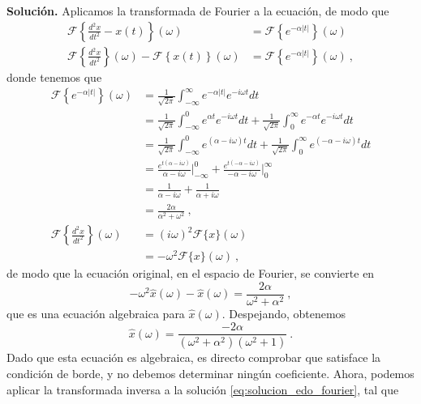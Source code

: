 \begin{ejemplo}
    \textbf{Solución.} Aplicamos la transformada de Fourier a la ecuación, de modo que
    \begin{align}
        \mathcal{F}\left\{ \frac{d^2 x}{dt^2} - x(t) \right\}(\omega) & =  \mathcal{F} \left\{ e^{-\alpha |t|} \right\}(\omega) \\
        \mathcal{F} \left\{ \frac{d^2x}{dt^2} \right\}(\omega) - \mathcal{F} \left\{ x(t) \right\}(\omega)  & = \mathcal{F} \left\{ e^{-\alpha |t|} \right\}(\omega) \ ,
    \end{align}
    donde tenemos que
    \begin{align}
        \mathcal{F} \left\{ e^{-\alpha |t|} \right\}(\omega) & = \frac{1}{\sqrt{2\pi}} \int_{-\infty}^\infty e^{-\alpha |t|} e^{-i\omega t} dt \nonumber \\
        & = \frac{1}{\sqrt{2\pi}} \int_{-\infty}^0 e^{\alpha t} e^{-i\omega t} dt + \frac{1}{\sqrt{2\pi}} \int_0^\infty e^{-\alpha t} e^{-i\omega t} dt \nonumber \\
        & = \frac{1}{\sqrt{2\pi}} \int_{-\infty}^0 e^{(\alpha -i\omega) t} dt + \frac{1}{\sqrt{2\pi}} \int_0^\infty e^{(-\alpha -i\omega) t} dt \nonumber \\
        & = \frac{e^{t(\alpha - i \omega)}}{\alpha - i\omega} \left.\right|_{-\infty}^0 + \frac{e^{t(-\alpha - i \omega)}}{-\alpha - i\omega} \left.\right|_0^{\infty} \nonumber \\
        & = \frac{1}{\alpha - i\omega} + \frac{1}{\alpha + i\omega} \nonumber \\
        & = \frac{2\alpha}{\alpha^2 + \omega^2} \ , \\
        \mathcal{F} \left\{ \frac{d^2x}{dt^2} \right\}(\omega) & = (i\omega)^2 \mathcal{F}\{ x \}(\omega) \nonumber \\
        & = -\omega^2 \mathcal{F}\{ x \}(\omega) \ ,
    \end{align}
    de modo que la ecuación original, en el espacio de Fourier, se convierte en
    \begin{equation}
        -\omega^2 \hat{x}(\omega) - \hat{x}(\omega) = \frac{2\alpha}{\omega^2 + \alpha^2} \ ,
    \end{equation}
    que es una ecuación algebraica para $\hat{x}(\omega)$. Despejando, obtenemos
    \begin{equation} \label{eq:solucion_edo_fourier}
        \hat{x}(\omega) = \frac{-2\alpha}{(\omega^2 + \alpha^2) (\omega^2 + 1)} \ .
    \end{equation}
    Dado que esta ecuación es algebraica, es directo comprobar que satisface la condición de borde, y no debemos determinar ningún coeficiente. Ahora, podemos aplicar la transformada inversa a la solución \eqref{eq:solucion_edo_fourier}, tal que

\end{ejemplo}
